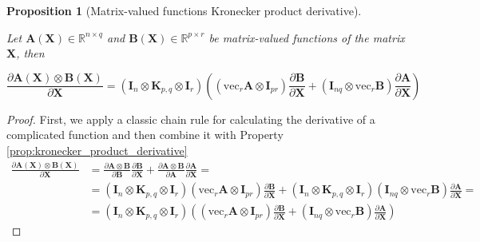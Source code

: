 \documentclass{article}
\newtheorem{proposition}{Proposition}
\begin{document}
\begin{proposition} [Matrix-valued functions Kronecker product derivative] \label{prop:matrix_funcs_kronecker_product_derivative}

Let  $\mathbf{A}(\mathbf{X}) \in \mathbb{R}^{n \times q}$ and $\mathbf{B}(\mathbf{X}) \in \mathbb{R}^{p \times r}$ be matrix-valued functions of the matrix $\mathbf{X}$, then

\begin{equation*}
    \frac{\partial\mathbf{A}(\mathbf{X}) \otimes \mathbf{B}(\mathbf{X})}{\partial \mathbf{X}} = (\mathbf{I}_n \otimes \mathbf{K}_{p,q} \otimes \mathbf{I}_r) \left( \left( \mathrm{vec}_r \mathbf{A} \otimes \mathbf{I}_{pr} \right) \frac{\partial\mathbf{B}}{\partial \mathbf{X}} + \left( \mathbf{I}_{nq} \otimes \mathrm{vec}_r \mathbf{B} \right) \frac{\partial\mathbf{A}}{\partial \mathbf{X}}\right)
\end{equation*}
    
\end{proposition}

\begin{proof}
    First, we apply a classic chain rule for calculating the derivative of a complicated function and then combine it with Property \ref{prop:kronecker_product_derivative}
    \begin{align*}
        \frac{\partial\mathbf{A}(\mathbf{X}) \otimes \mathbf{B}(\mathbf{X})}{\partial \mathbf{X}} &= \frac{\partial \mathbf{A}\otimes\mathbf{B}}{\partial\mathbf{B}}\frac{\partial\mathbf{B}}{\partial \mathbf{X}} + \frac{\partial \mathbf{A}\otimes\mathbf{B}}{\partial\mathbf{A}}\frac{\partial\mathbf{A}}{\partial \mathbf{X}} = \\
        &= (\mathbf{I}_n \otimes \mathbf{K}_{p,q} \otimes \mathbf{I}_r) \left( \mathrm{vec}_r \mathbf{A} \otimes \mathbf{I}_{pr} \right) \frac{\partial\mathbf{B}}{\partial \mathbf{X}} + (\mathbf{I}_n \otimes \mathbf{K}_{p,q} \otimes \mathbf{I}_r) \left( \mathbf{I}_{nq} \otimes \mathrm{vec}_r \mathbf{B} \right) \frac{\partial\mathbf{A}}{\partial \mathbf{X}} = \\
        &= (\mathbf{I}_n \otimes \mathbf{K}_{p,q} \otimes \mathbf{I}_r) \left( \left( \mathrm{vec}_r \mathbf{A} \otimes \mathbf{I}_{pr} \right) \frac{\partial\mathbf{B}}{\partial \mathbf{X}} + \left( \mathbf{I}_{nq} \otimes \mathrm{vec}_r \mathbf{B} \right) \frac{\partial\mathbf{A}}{\partial \mathbf{X}}\right)
    \end{align*}
\end{proof}
\end{document}
